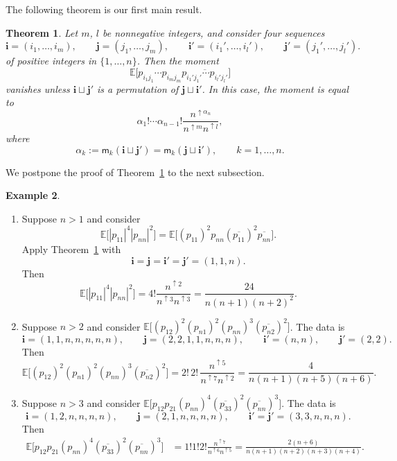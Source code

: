 \documentclass[pdftex]{sigma}
\numberwithin{equation}{section}
\newtheorem{Theorem}{Theorem}[section]
\theoremstyle{definition}
\newtheorem{Example}[Theorem]{Example}
\newcommand{\mult}{\mathsf{m}}
\begin{document}
The following theorem is our first main result.

\begin{Theorem} \label{thm:momentsP}
Let $m$, $l$ be nonnegative integers, and consider four sequences
\[
\bm{i}=(i_1,\dots, i_m), \qquad \bm{j} =(j_1,\dots, j_m), \qquad
\bm{i}'=(i_1',\dots, i_l'), \qquad \bm{j}' =(j_1',\dots, j_l').
\]
of positive integers in $\{1,\dots, n\}$.
Then the moment
\[
\mathbb{E} \bigl[ p_{i_1 j_1} \cdots p_{i_m j_m} \overline{p_{i_1' j_1'} \cdots p_{i_l' j_l'}} \bigr]
\]
vanishes unless $\bm{i} \sqcup \bm{j}'$ is a permutation of $\bm{j} \sqcup \bm{i}'$.
In this case, the moment is equal to
\[
\alpha_1! \cdots \alpha_{n-1}! \frac{n^{\uparrow \alpha_n}}{n^{\uparrow m}n^{\uparrow l}},
\]
where
\[
\alpha_k := \mult_{k}(\bm{i}\sqcup \bm{j}') = \mult_{k}(\bm{j} \sqcup \bm{i}'),
\qquad k=1,\dots,n.
\]
\end{Theorem}

We postpone the proof of Theorem~\ref{thm:momentsP} to the next subsection.

\begin{Example}\label{ex:momentsP_examples}\quad
\begin{enumerate}\itemsep=0pt
\item Suppose $n>1$ and consider
\[
\mathbb{E} \bigl[|p_{11}|^4 |p_{nn}|^2\bigr]
=\mathbb{E}\bigl[(p_{11})^2 p_{nn} (\overline{p_{11}})^2 \overline{p_{nn}}\bigr].
\]
Apply Theorem~\ref{thm:momentsP} with
\[
\bm{i} =\bm{j}=\bm{i}'=\bm{j}'=(1,1,n).
\]
Then
\[
\mathbb{E} \bigl[|p_{11}|^4 |p_{nn}|^2\bigr] =4! \frac{n^{\uparrow 2}}{n^{\uparrow 3} n^{\uparrow 3}}
= \frac{24}{n(n+1) (n+2)^2}.
\]
\item Suppose $n>2$ and
consider $\mathbb{E}\bigl[(p_{12})^2 (p_{n1})^2(p_{nn})^3 (\overline{p_{n2}})^2 \bigr]$.
The data is
\[
\bm{i}=(1,1,n,n,n,n,n), \qquad \bm{j}=(2,2,1,1,n,n,n), \qquad \bm{i}'=(n,n), \qquad \bm{j}'=(2,2).
\]
Then
\[
\mathbb{E}\bigl[(p_{12})^2 (p_{n1})^2(p_{nn})^3 (\overline{p_{n2}})^2 \bigr]
= 2! \, 2! \, \frac{n^{\uparrow 5}}{n^{\uparrow 7} n^{\uparrow 2}}
= \frac{4}{n(n+1)(n+5)(n+6)}.
\]
\item Suppose $n>3$ and consider $\mathbb{E} \bigl[p_{12} p_{21} (p_{nn})^4 (\overline{p_{33}})^2
(\overline{p_{nn}})^3\bigr]$.
The data is
\[
\bm{i}=(1,2,n,n,n,n), \qquad \bm{j}=(2,1,n,n,n,n), \qquad \bm{i}'= \bm{j}'=(3,3,n,n,n).
\]
Then
\begin{align*}
\mathbb{E} \bigl[p_{12} p_{21} (p_{nn})^4 (\overline{p_{33}})^2
(\overline{p_{nn}})^3\bigr] &= 1! 1! 2! \frac{n^{\uparrow 7}}{n^{\uparrow 6} n^{\uparrow 5}}
 =
\frac{2(n+6)}{n(n+1)(n+2)(n+3)(n+4)}.
\end{align*}
\end{enumerate}
\end{Example}
\end{document}
